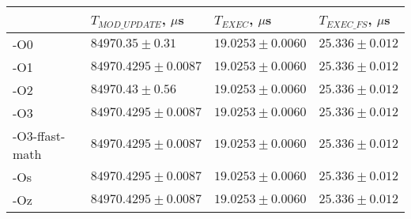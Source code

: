 \begin{tabular}{llll}
\toprule
 & $T_{MOD\_UPDATE}$, $\mu$s & $T_{EXEC}$, $\mu$s & $T_{EXEC\_FS}$, $\mu$s \\
\midrule
-O0 & $84970.35 \pm 0.31$ & $19.0253 \pm 0.0060$ & $25.336 \pm 0.012$ \\
-O1 & $84970.4295 \pm 0.0087$ & $19.0253 \pm 0.0060$ & $25.336 \pm 0.012$ \\
-O2 & $84970.43 \pm 0.56$ & $19.0253 \pm 0.0060$ & $25.336 \pm 0.012$ \\
-O3 & $84970.4295 \pm 0.0087$ & $19.0253 \pm 0.0060$ & $25.336 \pm 0.012$ \\
-O3-ffast-math & $84970.4295 \pm 0.0087$ & $19.0253 \pm 0.0060$ & $25.336 \pm 0.012$ \\
-Os & $84970.4295 \pm 0.0087$ & $19.0253 \pm 0.0060$ & $25.336 \pm 0.012$ \\
-Oz & $84970.4295 \pm 0.0087$ & $19.0253 \pm 0.0060$ & $25.336 \pm 0.012$ \\
\bottomrule
\end{tabular}
